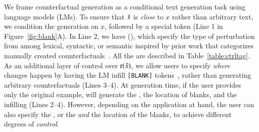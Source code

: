 We frame counterfactual generation as a conditional text generation task using language models (LMs). To ensure that $\hat{x}$ is \emph{close} to $x$ rather than arbitrary text, we condition the generation on $x$, followed by a special token (Line 1 in Figure~\ref{fig:blank}A).
In Line 2, we have \emph{\tagstrs} (\eg {}), which specify the type of perturbation from among lexical, syntactic, or semantic \tagstrshorts inspired by prior work that categorizes manually created counterfactuals~\cite{kaushik2019learning, gardner2020contrast}.
All the \tagstrshorts are described in Table~\ref{table:ctrltag}. 
As an additional layer of control over $\operatorname*{r}(\hat{x})$, we allow users to specify \emph{where} changes happen by having the LM infill \texttt{[BLANK]} tokens~\cite{donahue2020enabling}, rather than generating arbitrary counterfactuals (Lines 3--4).
At generation time, if the user provides only the original example, \sysname will generate the \tagstr, the location of blanks, and the infilling (Lines 2--4). 
However, depending on the application at hand, the user can also specify the \tagstr, or the \tagstr \emph{and} the location of the blanks, to achieve different degrees of \emph{control}.




